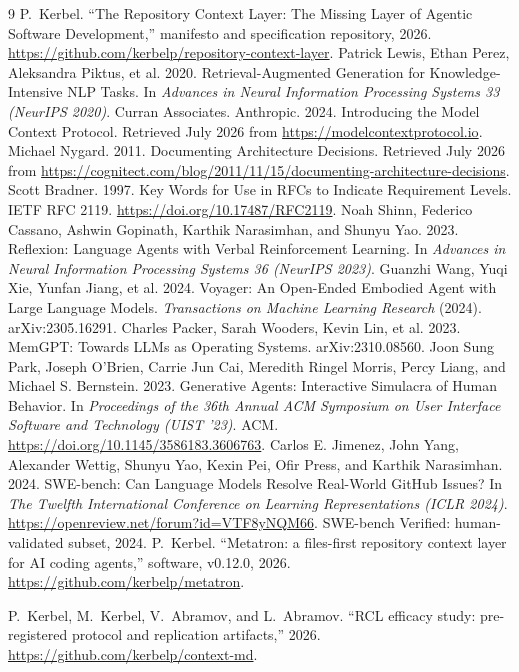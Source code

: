 \documentclass[sigconf,nonacm]{acmart}
\newcommand{\artifact}{\url{https://github.com/kerbelp/context-md}}
\begin{document}
\begin{thebibliography}{9}
 P.~Kerbel. ``The Repository Context Layer: The Missing Layer of Agentic Software Development,'' manifesto and specification repository, 2026. \url{https://github.com/kerbelp/repository-context-layer}.
 Patrick Lewis, Ethan Perez, Aleksandra Piktus, et al. 2020. Retrieval-Augmented Generation for Knowledge-Intensive NLP Tasks. In \emph{Advances in Neural Information Processing Systems 33 (NeurIPS 2020)}. Curran Associates.
 Anthropic. 2024. Introducing the Model Context Protocol. Retrieved July 2026 from \url{https://modelcontextprotocol.io}.
 Michael Nygard. 2011. Documenting Architecture Decisions. Retrieved July 2026 from \url{https://cognitect.com/blog/2011/11/15/documenting-architecture-decisions}.
 Scott Bradner. 1997. Key Words for Use in RFCs to Indicate Requirement Levels. IETF RFC 2119. \url{https://doi.org/10.17487/RFC2119}.
 Noah Shinn, Federico Cassano, Ashwin Gopinath, Karthik Narasimhan, and Shunyu Yao. 2023. Reflexion: Language Agents with Verbal Reinforcement Learning. In \emph{Advances in Neural Information Processing Systems 36 (NeurIPS 2023)}.
 Guanzhi Wang, Yuqi Xie, Yunfan Jiang, et al. 2024. Voyager: An Open-Ended Embodied Agent with Large Language Models. \emph{Transactions on Machine Learning Research} (2024). arXiv:2305.16291.
 Charles Packer, Sarah Wooders, Kevin Lin, et al. 2023. MemGPT: Towards LLMs as Operating Systems. arXiv:2310.08560.
 Joon Sung Park, Joseph O'Brien, Carrie Jun Cai, Meredith Ringel Morris, Percy Liang, and Michael S. Bernstein. 2023. Generative Agents: Interactive Simulacra of Human Behavior. In \emph{Proceedings of the 36th Annual ACM Symposium on User Interface Software and Technology (UIST '23)}. ACM. \url{https://doi.org/10.1145/3586183.3606763}.
 Carlos E. Jimenez, John Yang, Alexander Wettig, Shunyu Yao, Kexin Pei, Ofir Press, and Karthik Narasimhan. 2024. SWE-bench: Can Language Models Resolve Real-World GitHub Issues? In \emph{The Twelfth International Conference on Learning Representations (ICLR 2024)}. \url{https://openreview.net/forum?id=VTF8yNQM66}. SWE-bench Verified: human-validated subset, 2024.
 P.~Kerbel. ``Metatron: a files-first repository context layer for AI coding agents,'' software, v0.12.0, 2026. \url{https://github.com/kerbelp/metatron}.

 P.~Kerbel, M.~Kerbel, V.~Abramov, and L.~Abramov. ``RCL efficacy study: pre-registered protocol and replication artifacts,'' 2026. \artifact.
\end{thebibliography}
\end{document}
